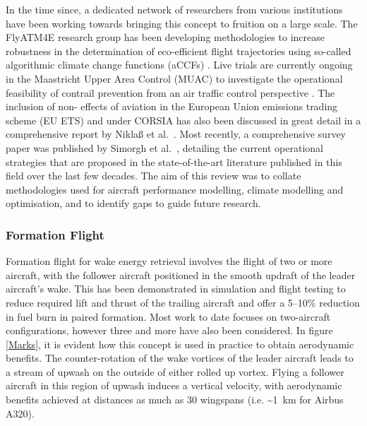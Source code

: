 In the time since, a dedicated network of researchers from various institutions have been working towards bringing this concept to fruition on a large scale. The FlyATM4E research group has been developing methodologies to increase robustness in the determination of eco-efficient flight trajectories using so-called algorithmic climate change functions (aCCFs) \cite{Matthes2020}. Live trials are currently ongoing in the Maastricht Upper Area Control (MUAC) to investigate the operational feasibility of contrail prevention from an air traffic control perspective \cite{MUAC2021}. The inclusion of non- effects of aviation in the European Union emissions trading scheme (EU ETS) and under CORSIA has also been discussed in great detail in a comprehensive report by Nikla{\ss} et al.\ \cite{Niklass2019b}. Most recently, a comprehensive survey paper was published by Simorgh et al.\ \cite{Simorgh2022}, detailing the current operational strategies that are proposed in the state-of-the-art literature published in this field over the last few decades. The aim of this review was to collate methodologies used for aircraft performance modelling, climate modelling and optimisation, and to identify gaps to guide future research.




\subsubsection{Formation Flight}
\label{Formation_flight}
Formation flight for wake energy retrieval involves the flight of two or more aircraft, with the follower aircraft positioned in the smooth updraft of the leader aircraft’s wake. This has been demonstrated in simulation \cite{Venkataramanan2003, Bangash2004} and flight testing \cite{Hanson2002} to reduce required lift and thrust of the trailing aircraft and offer a 5--10\% reduction in fuel burn in paired formation. Most work to date focuses on two-aircraft configurations, however three \cite{Bower2009} and more have also been considered. In figure \ref{Marks}, it is evident how this concept is used in practice to obtain aerodynamic benefits. The counter-rotation of the wake vortices of the leader aircraft leads to a stream of upwash on the outside of either rolled up vortex. Flying a follower aircraft in this region of upwash induces a vertical velocity, with aerodynamic benefits achieved at distances as much as 30 wingspans (i.e. \textasciitilde1~km for Airbus A320).

